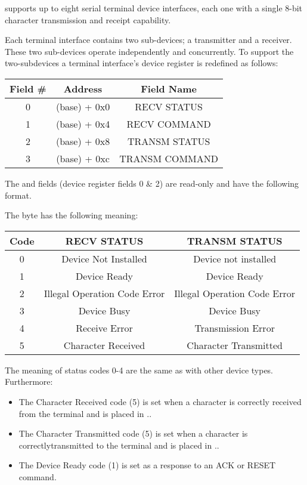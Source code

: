 
\uarm{} supports up to eight serial terminal device interfaces, each one with a single 8-bit character transmission and receipt capability.

Each terminal interface contains two sub-devices; a transmitter and a receiver. 
These two sub-devices operate independently and concurrently. 
To support the two-subdevices a terminal interface’s device register is redefined as follows:

\begin{center}
	\begin{tabular}{|c|c|c|}
		\hline
		Field \# & Address & Field Name\\
		\hline
		\hline
		0 & (base) + 0x0 & RECV STATUS\\
		\hline
		1 & (base) + 0x4 & RECV COMMAND\\
		\hline
		2 & (base) + 0x8 & TRANSM STATUS\\
		\hline
		3 & (base) + 0xc & TRANSM COMMAND\\
		\hline
	\end{tabular}
\end{center}

The  and  fields (device register fields 0 \& 2) are read-only and have the following format.


The  byte has the following meaning:

\begin{center}
	\begin{tabular}{|c|c|c|}
		\hline
		Code & RECV STATUS & TRANSM STATUS\\
		\hline
		\hline
		0 & Device Not Installed & Device not installed\\
		\hline
		1 & Device Ready & Device Ready\\
		\hline
		2 & Illegal Operation Code Error & Illegal Operation Code Error\\
		\hline
		3 & Device Busy & Device Busy\\
		\hline
		4 & Receive Error & Transmission Error\\
		\hline
		5 & Character Received & Character Transmitted\\
		\hline
	\end{tabular}
\end{center}

The meaning of status codes 0-4 are the same as with other device types.
Furthermore:
\begin{itemize}
	\item The Character Received code (5) is set when a character is correctly received from the terminal and is placed in ..
	\item The Character Transmitted code (5) is set when a character is correctlytransmitted to the terminal and is placed in ..
	\item The Device Ready code (1) is set as a response to an ACK or RESET command.
\end{itemize}

